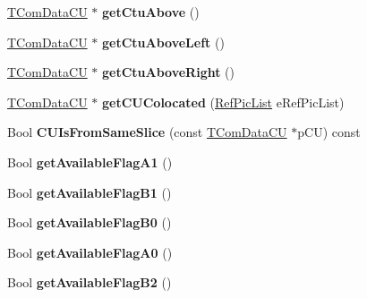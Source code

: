 \begin{DoxyCompactItemize}
\hyperlink{class_t_com_data_c_u}{T\+Com\+Data\+CU} $\ast$ {\bfseries get\+Ctu\+Above} ()
\item 
\mbox{\label{class_t_com_data_c_u_abbb6c17d151f833ba9c3e02cad40dcad}} 
\hyperlink{class_t_com_data_c_u}{T\+Com\+Data\+CU} $\ast$ {\bfseries get\+Ctu\+Above\+Left} ()
\item 
\mbox{\label{class_t_com_data_c_u_aab311da854744960e692bf9cf3f03e0f}} 
\hyperlink{class_t_com_data_c_u}{T\+Com\+Data\+CU} $\ast$ {\bfseries get\+Ctu\+Above\+Right} ()
\item 
\mbox{\label{class_t_com_data_c_u_a5f10cfe45d13d62904c4fc8ccac05a9b}} 
\hyperlink{class_t_com_data_c_u}{T\+Com\+Data\+CU} $\ast$ {\bfseries get\+C\+U\+Colocated} (\hyperlink{_type_def_8h_a93cea48eb9dcfd661168dee82e41b384}{Ref\+Pic\+List} e\+Ref\+Pic\+List)
\item 
\mbox{\label{class_t_com_data_c_u_a96c07f7fb8e3ebe49e0c6967e1e5bfeb}} 
Bool {\bfseries C\+U\+Is\+From\+Same\+Slice} (const \hyperlink{class_t_com_data_c_u}{T\+Com\+Data\+CU} $\ast$p\+CU) const
\item 
\mbox{\label{class_t_com_data_c_u_ab64f63ab93cad5d190ed5a2a3d058d83}} 
Bool {\bfseries get\+Available\+Flag\+A1} ()
\item 
\mbox{\label{class_t_com_data_c_u_a4ca5f6f7be7c27357ba482a268ba4c8b}} 
Bool {\bfseries get\+Available\+Flag\+B1} ()
\item 
\mbox{\label{class_t_com_data_c_u_af9a3a17904e410834c513def8a4ae00b}} 
Bool {\bfseries get\+Available\+Flag\+B0} ()
\item 
\mbox{\label{class_t_com_data_c_u_af39080cdfd189e4263801deb75c8f1b5}} 
Bool {\bfseries get\+Available\+Flag\+A0} ()
\item 
\mbox{\label{class_t_com_data_c_u_ac80a2dab8908cf0374fc19b2cc508b85}} 
Bool {\bfseries get\+Available\+Flag\+B2} ()
\item 
\mbox{\label{class_t_com_data_c_u_a2f8c1642e6f5a535d85c3371f0fd009b}} 

\end{DoxyCompactItemize}
